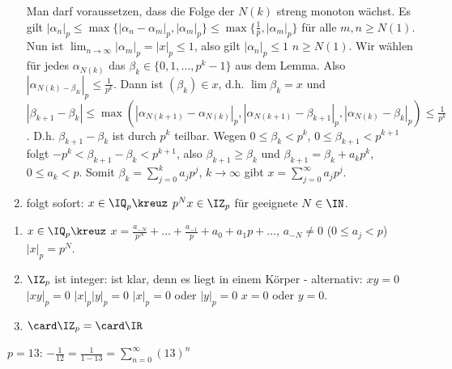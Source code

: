 \begin{Beweis}
\begin{enumerate}
  Man darf voraussetzen, dass die Folge der $N(k)$ streng monoton wächst. Es gilt $|\alpha_n|_p\leq\max\{|\alpha_n-\alpha_m|_p,|\alpha_m|_p\}\leq\max\{\frac{1}{p},|\alpha_m|_p\}$ für alle $m,n\geq N(1)$.
  Nun ist $\lim_{n\rightarrow\infty} |\alpha_m|_p=|x|_p\leq 1$, also gilt $|\alpha_n|_p\leq 1$ \forall $n\geq N(1)$. Wir wählen für jedes $\alpha_{N(k)}$ das $\beta_k\in\{0,1,\ldots,p^k-1\}$ aus dem Lemma. Also $|\alpha_{N(k)-\beta_K}|_p\leq \frac{1}{p^k}$. Dann ist $(\beta_k)\in x$, d.h. $\lim\beta_k=x$ und $|\beta_{k+1}-\beta_k|\leq \max(|\alpha_{N(k+1)}-\alpha_{N(k)}|_p,|\alpha_{N(k+1)}-\beta_{k+1}|_p,|\alpha_{N(k)}-\beta_k|_p)\leq \frac{1}{p^k}$. D.h. $\beta_{k+1}-\beta_k$ ist durch $p^k$ teilbar. Wegen $0\leq \beta_k<p^k$, $0\leq \beta_{k+1}<p^{k+1}$ folgt $-p^k<\beta_{k+1}-\beta_k<p^{k+1}$, also $\beta_{k+1}\geq \beta_k$ und $\beta_{k+1}=\beta_k+a_kp^k$, $0\leq a_k<p$. Somit $\beta_k=\sum_{j=0}^k a_jp^j$, $k\rightarrow\infty$ gibt $x=\sum_{j=0}^\infty a_jp^j$.
  \item folgt sofort: $x\in\IQ_p\kreuz$ \folge $p^Nx\in\IZ_p$ für geeignete $N\in\IN$.
\end{enumerate}  
\end{Beweis}
  
  \begin{Folgerung}
   \begin{enumerate}
    \item $x\in\IQ_p\kreuz$ \folge $x=\frac{a_{-N}}{p^N}+\ldots+\frac{a_{-1}}{p}+a_0+a_1p+\ldots$, $a_{-N}\neq 0$ ($0\leq a_j<p$) \folge $|x|_p=p^N$.
    \item $\IZ_p$ ist integer: ist klar, denn es liegt in einem Körper - alternativ: $xy=0$ \folge $|xy|_p=0$ \folge $|x|_p|y|_p=0$ \folge $|x|_p=0$ oder $|y|_p=0$ \folge $x=0$ oder $y=0$.
    \item $\card \IZ_p=\card\IR$
   \end{enumerate}
  \end{Folgerung}

   \begin{Beispiel}
    $p=13$: $-\frac{1}{12}=\frac{1}{1-13}=\sum_{n=0}^{\infty}(13)^n$
   \end{Beispiel}





